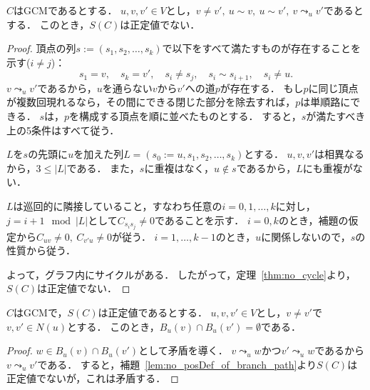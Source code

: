 \begin{lemma}
  \label{lem:no_posDef_of_branch_path}
  \leanok
  $C$はGCMであるとする．
  $u, v, v' \in V$とし，$v \ne v',\ u \sim v,\ u \sim v',\ v \leadsto_u v'$であるとする．
  このとき，$S(C)$は正定値でない．
\end{lemma}

\begin{proof}
  頂点の列$s := (s_1, s_2, \ldots, s_k)$で以下をすべて満たすものが存在することを示す($i \ne j$)：
  \begin{equation}
    s_1 = v,\quad s_k = v',\quad s_i \ne s_j,\quad s_i \sim s_{i+1},\quad s_i \ne u.
  \end{equation}
  $v \leadsto_u v'$であるから，$u$を通らない$v$から$v'$への道$p$が存在する．
  もし$p$に同じ頂点が複数回現れるなら，その間にできる閉じた部分を除去すれば，$p$は単順路にできる．
  $s$は，$p$を構成する頂点を順に並べたものとする．
  すると，$s$が満たすべき上の5条件はすべて従う．

  $L$を$s$の先頭に$u$を加えた列$L = (s_0 := u, s_1, s_2, \ldots, s_k)$とする．
  $u, v, v'$は相異なるから，$3 \le |L|$である．
  また，$s$に重複はなく，$u \notin s$であるから，$L$にも重複がない．

  $L$は巡回的に隣接していること，すなわち任意の$i = 0, 1, \ldots, k$に対し，$j = i + 1 \mod |L|$として$C_{s_i s_j} \ne 0$であることを示す．
  $i = 0, k$のとき，補題の仮定から$C_{uv} \ne 0,\ C_{v'u} \ne 0$が従う．
  $i = 1, \ldots, k-1$のとき，$u$に関係しないので，$s$の性質から従う．

  よって，グラフ内にサイクルがある．
  したがって，定理~\ref{thm:no_cycle}より，$S(C)$は正定値でない．
\end{proof}

\begin{lemma}
  \label{lem:branches_disjoint}
  \leanok
  $C$はGCMで，$S(C)$は正定値であるとする．
  $u, v, v' \in V$とし，$v \ne v'$で$v, v' \in N(u)$とする．
  このとき，$B_u(v) \cap B_u(v') = \emptyset$である．
\end{lemma}

\begin{proof}
  $w \in B_u(v) \cap B_u(v')$として矛盾を導く．
  $v \leadsto_u w$かつ$v' \leadsto_u w$であるから$v \leadsto_u v'$である．
  すると，補題~\ref{lem:no_posDef_of_branch_path}より$S(C)$は正定値でないが，これは矛盾する．
\end{proof}

